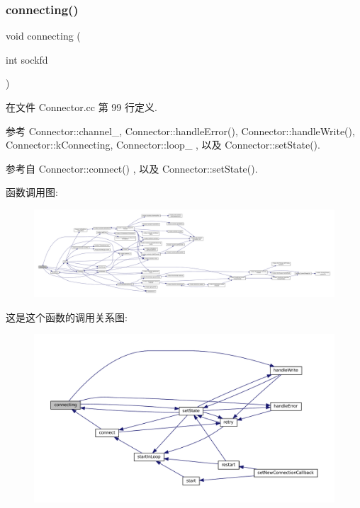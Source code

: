\subsubsection{\texorpdfstring{connecting()}{connecting()}}
{\footnotesize\ttfamily void connecting (\begin{DoxyParamCaption}\item[{int}]{sockfd }\end{DoxyParamCaption})\hspace{0.3cm}{\ttfamily [private]}}



在文件 Connector.\+cc 第 99 行定义.



参考 Connector\+::channel\+\_\+, Connector\+::handle\+Error(), Connector\+::handle\+Write(), Connector\+::k\+Connecting, Connector\+::loop\+\_\+ , 以及 Connector\+::set\+State().



参考自 Connector\+::connect() , 以及 Connector\+::set\+State().

函数调用图\+:
\nopagebreak
\begin{figure}[H]
\begin{center}
\leavevmode
\includegraphics[width=350pt]{classmuduo_1_1Connector_a2e3471f37486a133ee848ea72ed7efc2_cgraph}
\end{center}
\end{figure}
这是这个函数的调用关系图\+:
\nopagebreak
\begin{figure}[H]
\begin{center}
\leavevmode
\includegraphics[width=350pt]{classmuduo_1_1Connector_a2e3471f37486a133ee848ea72ed7efc2_icgraph}
\end{center}
\end{figure}
\mbox{\label{classmuduo_1_1Connector_a70b275e63748ddd6da7d2171c540ccff}} 
